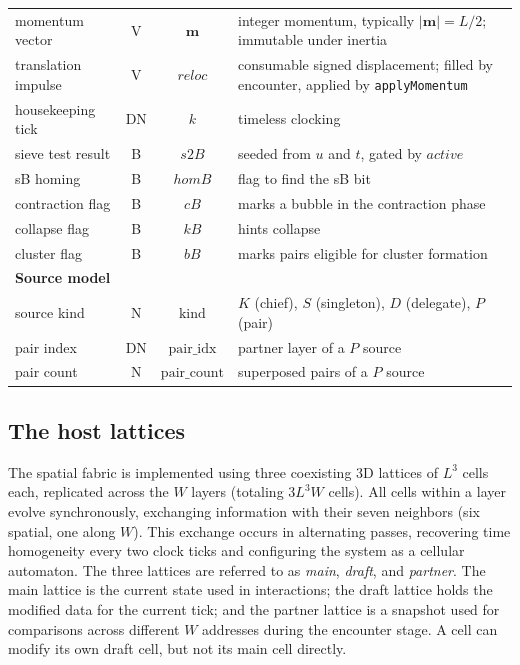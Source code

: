 \documentclass[a4paper]{article}
\begin{document}
\begin{table}[htbp]
\begin{tabular}{|l|c|c|l|}
momentum vector & V & $\boldsymbol{m}$ & integer momentum, typically $\lvert\boldsymbol{m}\rvert=L/2$; immutable under inertia \\
translation impulse & V & $\mathit{reloc}$ & consumable signed displacement; filled by encounter, applied by \texttt{applyMomentum} \\
housekeeping tick & DN & $k$ & timeless clocking \\
sieve test result & B & $s2B$ & seeded from $u$ and $t$, gated by $\mathit{active}$ \\
sB homing & B & $homB$ & flag to find the sB bit \\
contraction flag & B & $cB$ & marks a bubble in the contraction phase \\
collapse flag & B & $kB$ & hints collapse \\
cluster flag & B & $bB$ & marks pairs eligible for cluster formation \\
\hline
\textbf{Source model} & & & \\
\hline
source kind & N & $\mathrm{kind}$ & $K$ (chief), $S$ (singleton), $D$ (delegate), $P$ (pair) \\
pair index & DN & $\mathrm{pair\_idx}$ & partner layer of a $P$ source \\
pair count & N & $\mathrm{pair\_count}$ & superposed pairs of a $P$ source \\
\hline
\end{tabular}
\end{table}

\subsection{The host lattices}
\label{subsec:The-host-lattice}

The spatial fabric is implemented using three coexisting 3D lattices of $L^3$ cells each, replicated across the $W$ layers (totaling $3L^3W$ cells). All cells within a layer evolve synchronously, exchanging information with their seven neighbors (six spatial, one along $W$). This exchange occurs in alternating passes, recovering time homogeneity every two clock ticks and configuring the system as a cellular automaton. The three lattices are referred to as \emph{main}, \emph{draft}, and \emph{partner}. The main lattice is the current state used in interactions; the draft lattice holds the modified data for the current tick; and the partner lattice is a snapshot used for comparisons across different $W$ addresses during the encounter stage. A cell can modify its own draft cell, but not its main cell directly.
\end{document}

